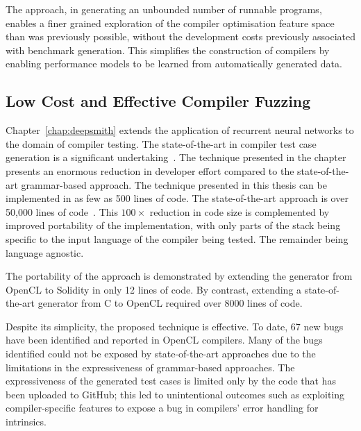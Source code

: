 The approach, in generating an unbounded number of runnable programs, enables a finer grained exploration of the compiler optimisation feature space than was previously possible, without the development costs previously associated with benchmark generation. This simplifies the construction of compilers by enabling performance models to be learned from automatically generated data.



\subsection{Low Cost and Effective Compiler Fuzzing}

Chapter~\ref{chap:deepsmith} extends the application of recurrent neural networks to the domain of compiler testing. The state-of-the-art in compiler test case generation is a significant undertaking~\cite{Yang2011,Lidbury2015a}. The technique presented in the chapter presents an enormous reduction in developer effort compared to the state-of-the-art grammar-based approach. The technique presented in this thesis can be implemented in as few as 500 lines of code. The state-of-the-art approach is over 50,000 lines of code~\cite{Lidbury2015a}. This $100\times$ reduction in code size is complemented by improved portability of the implementation, with only parts of the stack being specific to the input language of the compiler being tested. The remainder being language agnostic.

The portability of the approach is demonstrated by extending the generator from OpenCL to Solidity in only 12 lines of code. By contrast, extending a state-of-the-art generator from C to OpenCL required over 8000 lines of code.

Despite its simplicity, the proposed technique is effective. To date, 67 new bugs have been identified and reported in OpenCL compilers. Many of the bugs identified could not be exposed by state-of-the-art approaches due to the limitations in the expressiveness of grammar-based approaches. The expressiveness of the generated test cases is limited only by the code that has been uploaded to GitHub; this led to unintentional outcomes such as exploiting compiler-specific features to expose a bug in compilers' error handling for intrinsics.



